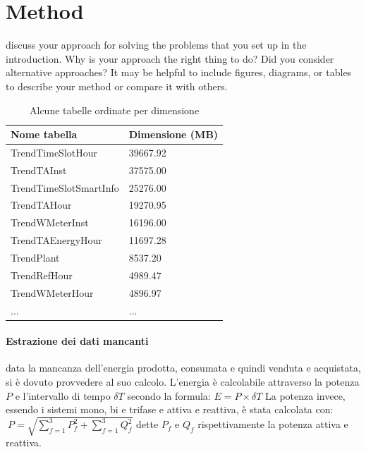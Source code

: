 \section{Method}
discuss your approach for solving the problems that you set up in the introduction. Why is your approach the right thing to do? Did you consider alternative approaches? It may be helpful to include figures, diagrams, or tables to describe your method or compare it with others.


\begin{table}[!ht]
    \begin{center}
        \caption{Alcune tabelle ordinate per dimensione}
        \label{tab:dim_ordered_tables}
        \begin{tabular}{l|l}
            \rowcolor{gray!50}
            \textbf{Nome tabella} & \textbf{Dimensione (MB)} \\
            \hline
            TrendTimeSlotHour & 39667.92\\
            TrendTAInst & 37575.00\\
            TrendTimeSlotSmartInfo & 25276.00\\
            TrendTAHour & 19270.95\\
            TrendWMeterInst & 16196.00\\
            TrendTAEnergyHour & 11697.28\\
            TrendPlant & 8537.20\\
            TrendRefHour & 4989.47\\
            TrendWMeterHour & 4896.97\\
            ... & ...\\
            \hline
        \end{tabular}
    \end{center}
\end{table}
\cite{ms_excel}

\paragraph{Estrazione dei dati mancanti}
data la mancanza dell'energia prodotta, consumata e quindi venduta e acquistata, si è dovuto provvedere al suo calcolo. L'energia è calcolabile attraverso la potenza \(P\) e l'intervallo di tempo \(\delta T\) secondo la formula: 
\(E = P\times \delta T \)
La potenza invece, essendo i sistemi mono, bi e trifase e attiva e reattiva, è stata calcolata con:
$\ P = \sqrt{\sum_{f=1}^{3} P_f^{2} + \sum_{f=1}^{3} Q_f^{2}}$
dette \(P_f\) e \(Q_f\) rispettivamente la potenza attiva e reattiva.

